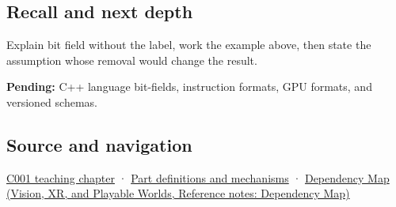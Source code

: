 \subsection{Recall and next depth}\label{appendix-ac697f5c66e8-recall-and-next-depth}

Explain bit field without the label, work the example above, then state the assumption whose removal would change the result.

\textbf{Pending:} C++ language bit-fields, instruction formats, GPU formats, and versioned schemas.

\subsection{Source and navigation}\label{appendix-ac697f5c66e8-source-and-navigation}

\hyperref[01-foundations-i-ch001-from-a-signal-to-an-interpretation]{C001 teaching chapter} · \hyperref[appendix-fd090d982a15]{Part definitions and mechanisms} · \href{../07-Vision-XR-and-Playable-Worlds/main.pdf\#nameddest=appendix-4ad47bdd269a}{Dependency Map (Vision, XR, and Playable Worlds, Reference notes: Dependency Map)}

